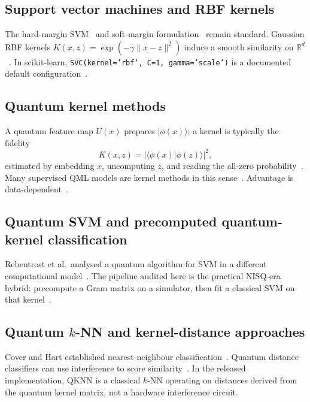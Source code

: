 \documentclass[11pt,a4paper]{article}
\begin{document}
\subsection{Support vector machines and RBF kernels}

The hard-margin SVM~\cite{boser1992training} and soft-margin formulation~\cite{cortes1995support} remain standard. Gaussian RBF kernels $K(x,z)=\exp(-\gamma\|x-z\|^2)$ induce a smooth similarity on $\mathbb{R}^d$~\cite{scholkopf2002learning}. In scikit-learn, \texttt{SVC(kernel='rbf', C=1, gamma='scale')} is a documented default configuration~\cite{pedregosa2011scikit}.

\subsection{Quantum kernel methods}

A quantum feature map $U(x)$ prepares $\lvert\phi(x)\rangle$; a kernel is typically the fidelity
\begin{equation}
K(x,z)=\lvert\langle\phi(x)\lvert\phi(z)\rangle\rvert^2,
\label{eq:fid}
\end{equation}
estimated by embedding $x$, uncomputing $z$, and reading the all-zero probability~\cite{havlicek2019quantum,schuld2019quantum}. Many supervised QML models are kernel methods in this sense~\cite{schuld2021supervised}. Advantage is data-dependent~\cite{huang2021power}.

\subsection{Quantum SVM and precomputed quantum-kernel classification}

Rebentrost et al.\ analysed a quantum algorithm for SVM in a different computational model~\cite{rebentrost2014quantum}. The pipeline audited here is the practical NISQ-era hybrid: precompute a Gram matrix on a simulator, then fit a classical SVM on that kernel~\cite{havlicek2019quantum,bergholm2018pennylane,pedregosa2011scikit}.

\subsection{Quantum $k$-NN and kernel-distance approaches}

Cover and Hart established nearest-neighbour classification~\cite{cover1967nearest}. Quantum distance classifiers can use interference to score similarity~\cite{schuld2017implementing}. In the released implementation, QKNN is a classical $k$-NN operating on distances derived from the quantum kernel matrix, not a hardware interference circuit.
\end{document}
